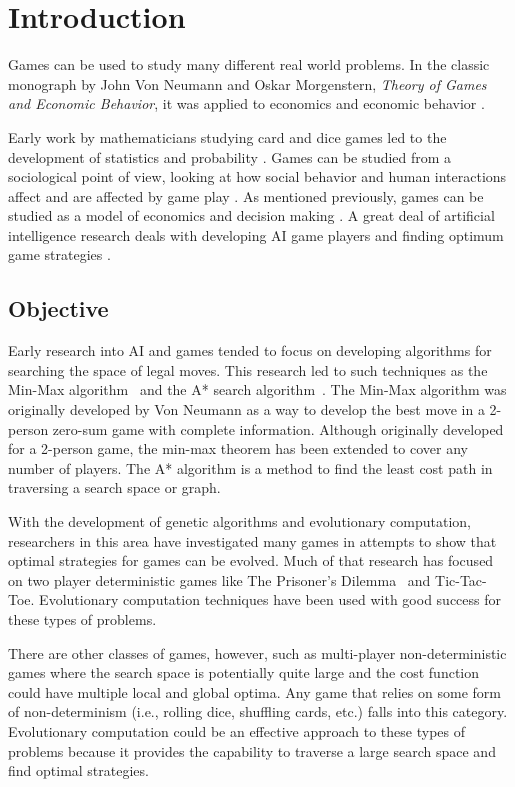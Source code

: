 \clearpage
\chapter{Introduction}\label{chap:intro}
Games can be used to study many different real world problems. In the
classic monograph by John Von Neumann and Oskar Morgenstern, \emph{Theory of
Games and Economic Behavior}, it was applied to economics and economic behavior
\cite{neumann1944theory}.

Early work by mathematicians studying card and dice games led to the development
of statistics and probability \cite{hald1990history,rudas2008handbook}. Games
can be studied from a sociological point of view, looking at how social behavior
and human interactions affect and are affected by game play
\cite{fararo1992meaning}. As mentioned previously, games can be studied as a
model of economics and decision making \cite{neumann1944theory}. A great deal of
artificial intelligence research deals with developing AI game players and
finding optimum game strategies \cite{russell2010artificial}.

\section{Objective}

Early research into AI and games tended to focus on developing algorithms for
searching the space of legal moves. This research led to such techniques as the
Min-Max algorithm~\cite{neumann1944theory} and the A* search
algorithm~\cite{Hart_Nilsson_Raphael_1968,Hart:1972:LFB:1056777.1056779}. The
Min-Max algorithm was originally developed by Von Neumann as a way to develop
the best move in a 2-person zero-sum game with complete information. Although
originally developed for a 2-person game, the min-max theorem has been extended
to cover any number of players. The A* algorithm is a method to find the least
cost path in traversing a search space or graph.

With the development of genetic algorithms and evolutionary computation,
re\-search\-ers in this area have investigated many games in attempts to show
that optimal strategies for games can be evolved. Much of that research has
focused on two player deterministic games like The Prisoner's
Dilemma~\cite{Flood1958} and Tic-Tac-Toe. Evolutionary computation techniques
have been used with good success for these types of problems.

There are other classes of games, however, such as multi-player
non-deterministic games where the search space is potentially quite large and
the cost function could have multiple local and global optima. Any game that
relies on some form of non-determinism (i.e., rolling dice, shuffling cards,
etc.) falls into this category. Evolutionary computation could be an effective
approach to these types of problems because it provides the capability to
traverse a large search space and find optimal strategies.

